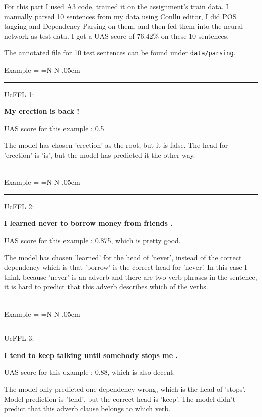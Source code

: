 \documentclass{article}
\newcommand\No[1][.13ex]{%
  \setbox0=\hbox{\scalebox{.7}{o}}%
  \setbox2=\hbox{N}%
  N\kern-.05em\stackengine{\dimexpr\ht0-\ht2+#1}{\belowbaseline[-\ht2]{\copy0}}%
    {\rule[-.13ex]{.7\wd0}{.13ex}}%
    {U}{c}{F}{F}{L}%
}
\begin{document}
\par For this part I used A3 code, trained it on the assignment's train data. I manually parsed 10 sentences from my data using Conllu editor, I did POS tagging and Dependency Parsing on them, and then fed them into the neural network as test data. I got a UAS score of 76.42\% on these 10 sentences.

\par The annotated file for 10 test sentences can be found under \texttt{data/parsing}.\\

\par Example \No1:

\textbf{My erection is back !}\\

\par UAS score for this example : 0.5

\par The model has chosen 'erection' as the root, but it is false. The head for 'erection' is 'is', but the model has predicted it the other way.\\\\

\par Example \No2:

\textbf{I learned never to borrow money from friends .}\\

\par UAS score for this example : 0.875, which is pretty good.

\par The model has chosen 'learned' for the head of 'never', instead of the correct dependency which is that 'borrow' is the correct head for 'never'. In this case I think because 'never' is an adverb and there are two verb phrases in the sentence, it is hard to predict that this adverb describes which of the verbs.\\\\

\par Example \No3:

\textbf{I tend to keep talking until somebody stops me
.}\\

\par UAS score for this example : 0.88, which is also decent.

\par The model only predicted one dependency wrong, which is the head of 'stops'. Model prediction is 'tend', but the correct head is 'keep'. The model didn't predict that this adverb clause belongs to which verb.\\\\
\end{document}

